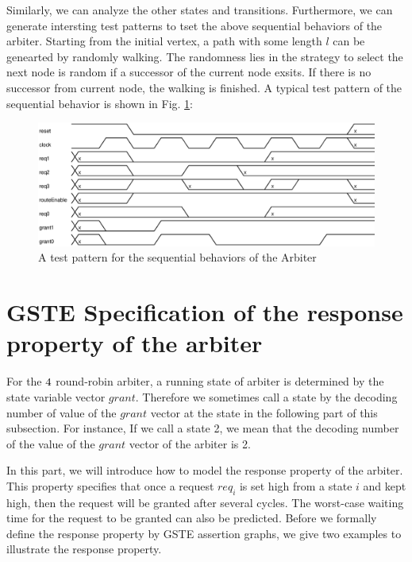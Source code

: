\documentclass[final]{IEEEtran}
\begin{document}
Similarly, we can analyze the other states and transitions.
Furthermore, we can generate intersting test patterns to tset the
above sequential behaviors of the arbiter. Starting from the initial
vertex, a path with some length $l$ can be genearted by randomly
walking. The randomness lies in the strategy to select the next node
is random if a successor of the current node exsits. If there is no
successor from current node, the walking is finished. A typical test
pattern of the sequential behavior is shown in Fig.
\ref{fig:TestPatternForSeq}:

\begin{figure}[tbph]
\begin{center}
\includegraphics[width=.5\textwidth]{TestPatternForSeq.eps}
\end{center}
\caption{A test pattern for the sequential behaviors of the Arbiter}
\label{fig:TestPatternForSeq}
\end{figure}


\section{GSTE Specification of the response property of the
arbiter}\label{secLiveness}



 For the $4\time 4$ round-robin arbiter, a running state of arbiter is
 determined  by the state variable vector $grant$. Therefore we
 sometimes call
 a state by   the decoding number of value of the $grant$ vector %
at the state in the following part of this subsection. For instance,
If  we call a state 2, we mean that the decoding number of the value
of the $grant$ vector of the arbiter is 2.



 In this part, we will introduce how to model the
response property of the arbiter. This property specifies that  once a request $req_i$ is
set high from a state $i$ and kept high, then the request will be
granted after several cycles. The worst-case waiting time for the
request to be granted can also be predicted. Before we
 formally define the response property by GSTE assertion graphs, we give two examples to illustrate the response
 property.
\end{document}
